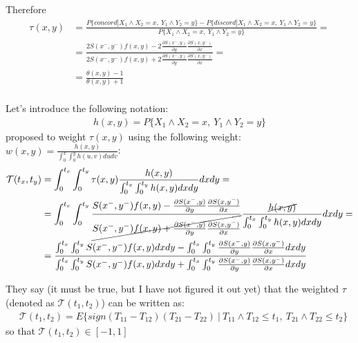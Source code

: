 \documentclass[]{article}
\begin{document}
Therefore
  $$
  \begin{aligned}
    \tau(x, y) &= \frac{P\{concord| X_{1}\wedge X_{2} = x,~Y_{1}\wedge Y_{2} = y\} - P\{discord|X_{1}\wedge X_{2} = x,~Y_{1}\wedge Y_{2} = y\}}{P\{X_{1}\wedge X_{2} = x,~Y_{1}\wedge Y_{2} = y\}} = \\   
     &= \frac{2S(x^-,y^-)f(x, y) - 2\frac{\partial S(x^-,y)}{\partial y}\frac{\partial S(x,y^-)}{\partial x} }{ 2S(x^-,y^-)f(x, y) + 2\frac{\partial S(x^-,y)}{\partial y}\frac{\partial S(x,y^-)}{\partial x} } =\\
     &= \frac{\theta(x, y) - 1}{\theta(x, y) + 1}
  \end{aligned}
  $$
~\\

Let's introduce the following notation:
	$$
	\begin{aligned}
		h(x, y) = P\{X_{1}\wedge X_{2} = x,~Y_{1}\wedge Y_{2} = y\}
	\end{aligned}
	$$
\cite{fan2000class} proposed to weight $\tau(x, y)$ using the following weight: $w(x, y) = \frac{h(x, y)}{\int_0^x \int_0^y h(u, v) dudv}$: 
	$$
	\begin{aligned}
		\mathcal{T}(t_x, t_y) &= \int_0^{t_x} \int_0^{t_y}  \tau(x, y)\frac{h(x, y)}{\int_0^{t_x} \int_0^{t_y} h(x, y) dxdy} dxdy = \\
    &= \int_0^{t_x} \int_0^{t_y}  \frac{S(x^-,y^-)f(x, y) - \frac{\partial S(x^-,y)}{\partial y}\frac{\partial S(x,y^-)}{\partial x} }{ \cancel{S(x^-,y^-)f(x, y) + \frac{\partial S(x^-,y)}{\partial y}\frac{\partial S(x,y^-)}{\partial x} }} \frac{\cancel{h(x, y)}}{\int_0^{t_x} \int_0^{t_y} h(x, y) dxdy} dxdy = \\
    &= \frac{ \int_0^{t_x} \int_0^{t_y} S(x^-,y^-)f(x, y)dxdy -  \int_0^{t_x} \int_0^{t_y} \frac{\partial S(x^-,y)}{\partial y}\frac{\partial S(x,y^-)}{\partial x}dxdy }{\int_0^{t_x} \int_0^{t_y} S(x^-,y^-)f(x, y)dxdy  +   \int_0^{t_x} \int_0^{t_y} \frac{\partial S(x^-,y)}{\partial y}\frac{\partial S(x,y^-)}{\partial x}dxdy }\\
	\end{aligned}
	$$

They say (it must be true, but I have not figured it out yet) that the weighted $\tau$ (denoted as $\mathcal{T}(t_1, t_2)$) can be written as:
	$$
	\begin{aligned}
		&\mathcal{T}(t_1, t_2) = E\{sign(T_{11} - T_{12}) (T_{21} - T_{22})~|~ T_{11}\wedge T_{12} \leq t_1,~T_{21}\wedge T_{22} \leq t_2  \}
	\end{aligned}
	$$
	so that $\mathcal{T}(t_1, t_2) \in [-1,1]$
\end{document}
